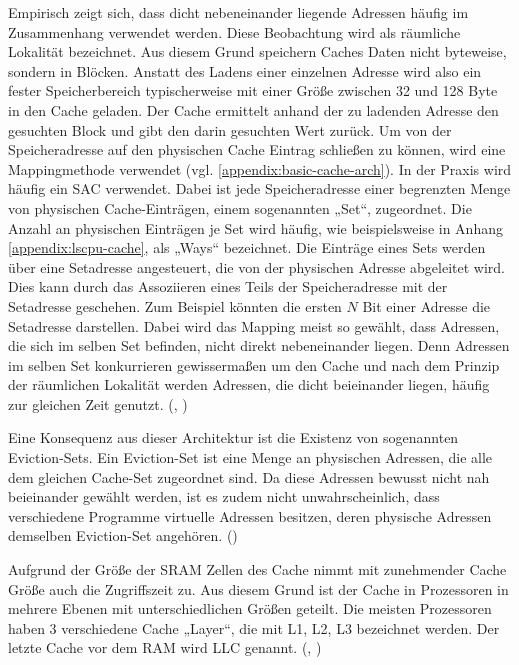 Empirisch zeigt sich, dass dicht
nebeneinander liegende Adressen häufig im Zusammenhang verwendet
werden. Diese Beobachtung wird als räumliche Lokalität
bezeichnet. Aus diesem Grund speichern Caches Daten nicht
byteweise, sondern in Blöcken. Anstatt des
Ladens einer einzelnen Adresse wird also ein fester
Speicherbereich \textendash\space typischerweise mit einer Größe
zwischen 32 und 128 Byte \textendash\space in
den Cache geladen. Der Cache ermittelt anhand der zu ladenden
Adresse den gesuchten Block und gibt den darin gesuchten
Wert zurück. Um von der Speicheradresse auf den physischen Cache
Eintrag schließen zu können, wird eine Mappingmethode verwendet
(vgl. \ref{appendix:basic-cache-arch}).
In der Praxis wird häufig ein \ac{SAC} verwendet. Dabei ist
jede Speicheradresse einer begrenzten Menge von physischen
Cache-Einträgen, einem sogenannten „Set“, zugeordnet. Die Anzahl
an physischen Einträgen je Set wird häufig, wie beispielsweise
in Anhang \ref{appendix:lscpu-cache}, als „Ways“ bezeichnet.
Die Einträge eines Sets werden über eine Setadresse angesteuert,
die von der physischen Adresse abgeleitet wird. Dies kann
durch das Assoziieren eines Teils der Speicheradresse
mit der Setadresse geschehen. Zum Beispiel könnten die
ersten $N$ Bit einer Adresse die Setadresse darstellen. Dabei
wird das Mapping meist so gewählt, dass Adressen, die sich im
selben Set befinden, nicht direkt nebeneinander liegen. Denn
Adressen im selben Set konkurrieren gewissermaßen um den Cache
und nach dem Prinzip der räumlichen Lokalität werden Adressen,
die dicht beieinander liegen, häufig zur gleichen Zeit genutzt.
(\cite[515,516]{sarangi_basic_2021}, \cite[16]{handy_cache_1993})

Eine Konsequenz aus dieser Architektur ist die
Existenz von sogenannten Eviction-Sets. Ein Eviction-Set ist eine
Menge an physischen Adressen, die alle dem gleichen Cache-Set
zugeordnet sind. Da diese Adressen bewusst nicht nah beieinander
gewählt werden, ist es zudem nicht unwahrscheinlich, dass
verschiedene Programme virtuelle Adressen besitzen, deren
physische Adressen demselben Eviction-Set angehören.
(\cite[40,41]{vila_theory_2019})

Aufgrund der Größe der \ac{SRAM} Zellen des Cache nimmt mit
zunehmender Cache Größe auch die Zugriffszeit zu. Aus diesem
Grund ist der Cache in Prozessoren in mehrere Ebenen
mit unterschiedlichen Größen geteilt. Die meisten Prozessoren
haben 3 verschiedene Cache „Layer“, die mit L1, L2, L3 bezeichnet
werden. Der letzte Cache vor dem \ac{RAM} wird \ac{LLC} genannt.
(\cite[388]{slomka_grundlagen_2023}, \cite[596]{sarangi_basic_2021})

